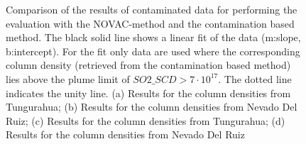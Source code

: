 \documentclass  [
  paper    = a4,
  BCOR     = 10mm,
  twoside,
  fontsize = 12pt,
  fleqn,
  toc      = bibnumbered,
  toc      = listofnumbered,
  numbers  = noendperiod,
  headings = normal,
  listof   = leveldown,
  version  = 3.03
]                                       {scrreprt}
\begin{document}
\begin{figure}[h!]
		\caption{Comparison of the results of contaminated data for performing the evaluation with the NOVAC-method and the contamination based method. The black solid line shows a linear fit of the data (m:slope, b:intercept). For the fit only data are used where the corresponding   column density (retrieved from the contamination based method) lies above the plume limit of $SO2\_SCD>7\cdot 10^{17}$. The dotted line indicates the unity line. (a) Results for the   column densities from Tungurahua; (b) Results for the   column densities from Nevado Del Ruiz; (c) Results for the   column densities from Tungurahua; (d) Results for the   column densities from Nevado Del Ruiz}
		\label{fig:diffNovac}
	\end{figure}
\begin{figure}[h!]		
\end{figure}
\end{document}
